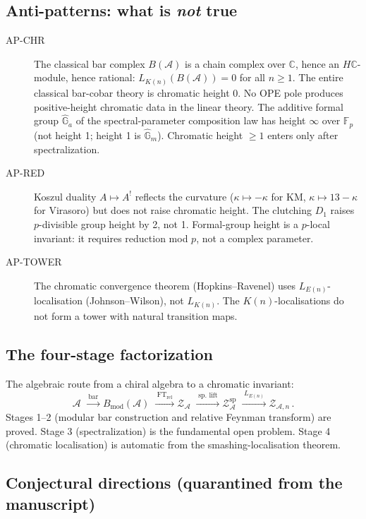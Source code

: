 \documentclass[11pt]{article}
\newcommand{\cA}{\mathcal{A}}
\newcommand{\cZ}{\mathcal{Z}}
\newcommand{\C}{\mathbb{C}}
\begin{document}
\subsection{Anti-patterns: what is \emph{not} true}

\begin{description}
\item[AP-CHR] The classical bar complex $B(\cA)$ is a chain complex
  over $\C$, hence an $H\C$-module, hence rational:
  $L_{K(n)}(B(\cA)) = 0$ for all $n \ge 1$.  The entire classical
  bar-cobar theory is chromatic height 0.  No OPE pole produces
  positive-height chromatic data in the linear theory.  The additive
  formal group $\hat{\mathbb{G}}_a$ of the spectral-parameter
  composition law has height $\infty$ over $\mathbb{F}_p$ (not height 1;
  height 1 is $\hat{\mathbb{G}}_m$).  Chromatic height $\ge 1$ enters
  only after spectralization.

\item[AP-RED] Koszul duality $A \mapsto A^!$ reflects the curvature
  ($\kappa \mapsto -\kappa$ for KM, $\kappa \mapsto 13 - \kappa$ for
  Virasoro) but does not raise chromatic height.  The clutching $D_1$
  raises $p$-divisible group height by 2, not 1.  Formal-group height
  is a $p$-local invariant: it requires reduction mod $p$, not a
  complex parameter.

\item[AP-TOWER] The chromatic convergence theorem (Hopkins--Ravenel) uses
  $L_{E(n)}$-localisation (Johnson--Wilson), not $L_{K(n)}$.  The
  $K(n)$-localisations do not form a tower with natural transition maps.
\end{description}

\subsection{The four-stage factorization}

The algebraic route from a chiral algebra to a chromatic invariant:
\[
  \cA
  \;\xrightarrow{\;\mathrm{bar}\;}
  B_{\mathrm{mod}}(\cA)
  \;\xrightarrow{\;\mathrm{FT}_{\mathrm{rel}}\;}
  \cZ_\cA
  \;\xrightarrow{\;\text{sp.\ lift}\;}
  \cZ_\cA^{\mathrm{sp}}
  \;\xrightarrow{\;L_{E(n)}\;}
  \cZ_{\cA,n}\,.
\]
Stages 1--2 (modular bar construction and relative Feynman transform) are
proved.  Stage 3 (spectralization) is the fundamental open problem.
Stage 4 (chromatic localisation) is automatic from the smashing-localisation
theorem.

\subsection{Conjectural directions (quarantined from the manuscript)}
\end{document}
